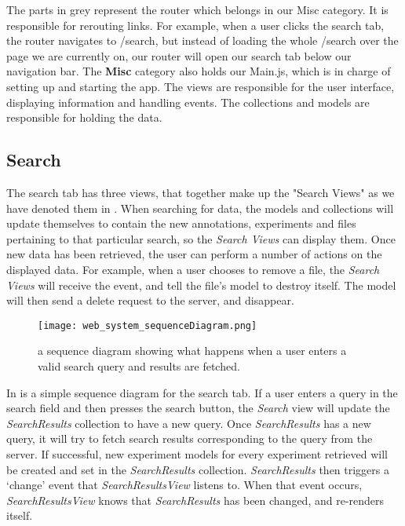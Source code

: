 The parts in grey represent the router which belongs in our Misc category. It is responsible for rerouting links. For example, when a user clicks the search tab, the router navigates to /search, but instead of loading the whole /search over the page we are currently on, our router will open our search tab below our navigation bar. The \textbf{Misc} category also holds our Main.js, which is in charge of setting up and starting the app. The views are responsible for the user interface, displaying information and handling events. The collections and models are responsible for holding the data.

\label{sec:web_search}
\subsection{Search}
The search tab has three views, that together make up the "Search Views" as we have denoted them in . When searching for data, the models and collections will update themselves to contain the new annotations, experiments and files pertaining to that particular search, so the \textit{Search Views} can display them. Once new data has been retrieved, the user can perform a number of actions on the displayed data. For example, when a user chooses to remove a file, the \textit{Search Views} will receive the event, and tell the file's model to destroy itself. The model will then send a delete request to the server, and disappear.

 
\begin{figure}[h]
\centering
\texttt{[image: web\_system\_sequenceDiagram.png]}
\caption{\label{fig:web_system_sequenceDiagram}a sequence diagram showing what happens when a user enters a valid search query and results are fetched.}
\end{figure}

In  is a simple sequence diagram for the search tab. If a user enters a query in the search field and then presses the search button, the \textit{Search} view will update the \textit{SearchResults} collection to have a new query. Once \textit{SearchResults} has a new query, it will try to fetch search results corresponding to the query from the server. If successful, new experiment models for every experiment retrieved will be created and set in the \textit{SearchResults} collection. \textit{SearchResults} then triggers a ‘change’ event that \textit{SearchResultsView} listens to. When that event occurs, \textit{SearchResultsView} knows that \textit{SearchResults} has been changed, and re-renders itself.

